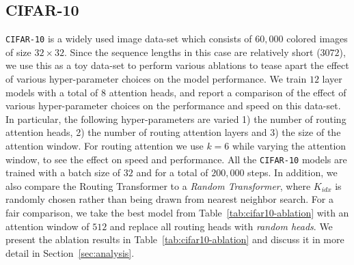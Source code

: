 \documentclass[a4paper]{article}
\begin{document}
\subsection{CIFAR-10}\label{sec:cifar}
\texttt{CIFAR-10} is a widely used image data-set which consists of \(60,000\) colored
images of size \(32\times 32\). Since the sequence lengths in this case are relatively
short (\(3072\)), we use this as a toy data-set to perform
various ablations to tease apart the effect of various hyper-parameter choices
on the model performance. We train \(12\) layer models
with a total of \(8\) attention heads, and report a comparison of the effect 
of various hyper-parameter choices on the performance and speed on this data-set. 
In particular, the following hyper-parameters are varied 1) the number of routing attention
heads, 2) the number of routing attention layers and 3) the size of the attention window.
For routing attention we use \(k = 6\) while varying the attention window, to see the
effect on speed and performance. All the \texttt{CIFAR-10} 
models are trained with a batch size of
\(32\) and for a total of \(200,000\) steps. 
In addition, we also compare the Routing Transformer to a \emph{Random Transformer},
where \(K_{idx}\) is randomly chosen rather than being drawn from nearest neighbor search.
For a fair comparison, we take the best model from Table~\ref{tab:cifar10-ablation}
with an attention window of \(512\) and replace all routing heads with \emph{random heads}.
We present the ablation results in Table~\ref{tab:cifar10-ablation} and discuss
it in more detail in Section~\ref{sec:analysis}.
\end{document}

